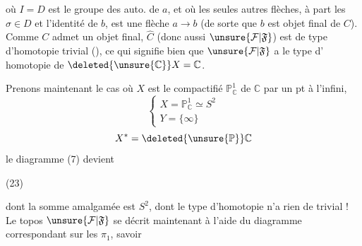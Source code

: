 où $I=D$ est le groupe des auto. de $a$, et où
les seules autres flèches, à part les $\sigma\in D$ et
l'identité de $b$, est une flèche $a\longrightarrow b$ (de
sorte que $b$ est objet final de $C$). Comme
$C$ admet un objet final, $\widehat C$  (donc aussi
$\unsure{\mathcal F|\mathfrak F}$) est de type d'homotopie trivial (),
ce qui signifie bien que $\unsure{\mathcal F|\mathfrak F}$ a le type d'
homotopie de $\deleted{\unsure{\mathbb C}}X=\mathbb C$.

Prenons maintenant le cas où $X$ est le
compactifié $\mathbb P^1_{\mathbb C}$ de $\mathbb C$ par un pt à l'infini,
\[
\left\{\begin{array}{l}
X=\mathbb P^1_{\mathbb C}\simeq S^2\\
Y=\{\infty\}
\end{array}\right.
\]
\[
X^*=\deleted{\unsure{\mathbb P}}\mathbb C
\]
le diagramme (7) devient

\noindent (23)

dont la somme amalgamée est $S^2$, dont
le type d'homotopie n'a rien de trivial !
Le topos $\unsure{\mathcal F|\mathfrak F}$ se décrit maintenant à
l'aide du diagramme correspondant sur les $\pi_1$,
savoir
